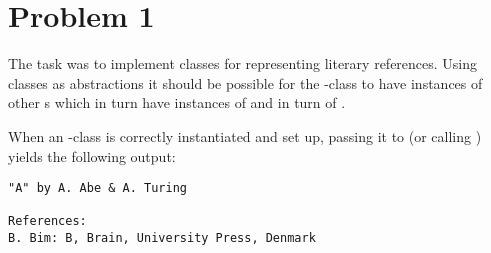 \section*{Problem 1}

The task was to implement classes for representing literary references. Using
classes as abstractions it should be possible for the -class to
have instances of other s which in turn have instances of
 and in turn of .

When an -class is correctly instantiated and set up, passing it
to  (or calling ) yields the following output:
\begin{Verbatim}
"A" by A. Abe & A. Turing

References:
B. Bim: B, Brain, University Press, Denmark
\end{Verbatim}
